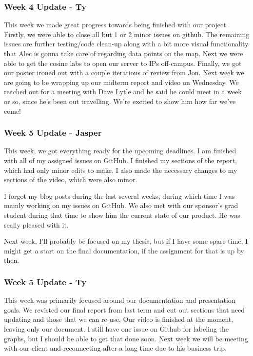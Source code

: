 \subsubsection{Week 4 Update - Ty}
This week we made great progress towards being finished with our project.
Firstly, we were able to close all but 1 or 2 minor issues on github​.
The remaining issues are further testing/code clean-up along with a bit more visual functionality that Alec is gonna take care of regarding data points on the map.
Next we were able to get the cosine labs to open our server to IPs off-campus.
Finally, we got our poster ironed out with a couple iterations of review from Jon.
Next week we are going to be wrapping up our midterm report and video on Wednesday.
We reached out for a meeting with Dave Lytle and he said he could meet in a week or so, since he's been out travelling.
We're excited to show him how far we've come!

\subsubsection{Week 5 Update - Jasper}
This week, we got everything ready for the upcoming deadlines.
I am finished with all of my assigned issues on GitHub.
I finished my sections of the report, which had only minor edits to make.
I also made the necessary changes to my sections of the video, which were also minor.

I forgot my blog posts during the last several weeks, during which time I was mainly working on my issues on GitHub.
We also met with our sponsor's grad student during that time to show him the current state of our product.
He was really pleased with it.

Next week, I'll probably be focused on my thesis, but if I have some spare time, I might get a start on the final documentation, if the assignment for that is up by then.

\subsubsection{Week 5 Update - Ty}
This week was primarily focused around our documentation and presentation goals.
We revisted our final report from last term and cut out sections that need updating and those that we can re-use.
Our video is finished at the moment, leaving only our document.
I still have one issue on Github for labeling the graphs, but I should be able to get that done soon.
​Next week we will be meeting with our client and reconnecting after a long time due to his business trip.

